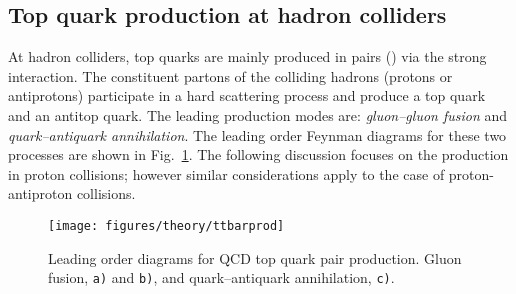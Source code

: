 \subsection{Top quark production at hadron colliders}
\label{sec:topprod}

At hadron colliders, top quarks are mainly produced in pairs
(\ttbar{}) via the strong interaction. The constituent partons of the
colliding hadrons (protons or antiprotons) participate in a hard
scattering process and produce a top quark and an antitop quark. The
leading production modes are: {\it gluon--gluon fusion} and {\it
  quark--antiquark annihilation}. The leading order Feynman diagrams
for these two processes are shown in Fig.~\ref{fig:ttbarprod}. The
following discussion focuses on the \ttbar{} production in proton
collisions; however similar considerations apply to the case of
proton-antiproton collisions.

\begin{figure}[!htb]\centering
  \texttt{[image: figures/theory/ttbarprod]}
  \caption{Leading order diagrams for QCD top quark pair production.
    Gluon fusion, {\tt a)} and {\tt b)}, and  quark--antiquark
    annihilation, {\tt c)}.}
  \label{fig:ttbarprod}
\end{figure}


